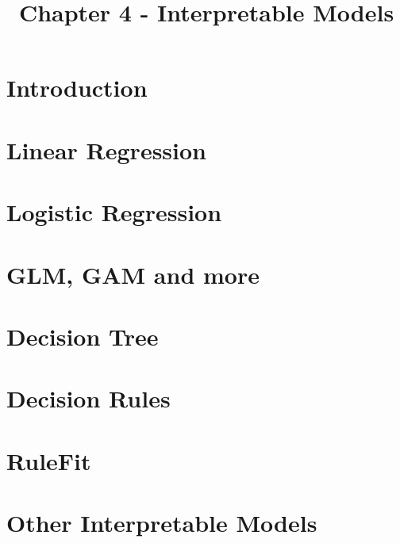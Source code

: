 \documentclass[a4paper]{article}
\title{Chapter 4 - Interpretable Models}
\date{}
\begin{document}
\maketitle

\section{Introduction}

\section{Linear Regression}

\section{Logistic Regression}

\section{GLM, GAM and more}

\section{Decision Tree}

\section{Decision Rules}

\section{RuleFit}

\section{Other Interpretable Models}
\end{document}
